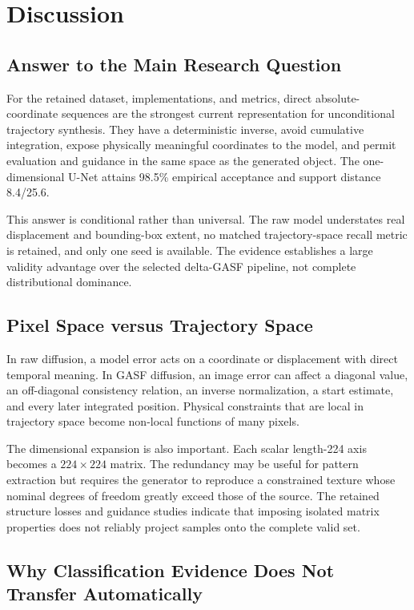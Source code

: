 \documentclass[12pt,a4paper,oneside]{report}
\begin{document}
\chapter{Discussion}
\label{chap:discussion}

\section{Answer to the Main Research Question}

For the retained dataset, implementations, and metrics, direct absolute-coordinate sequences are the strongest current representation for unconditional trajectory synthesis. They have a deterministic inverse, avoid cumulative integration, expose physically meaningful coordinates to the model, and permit evaluation and guidance in the same space as the generated object. The one-dimensional U-Net attains 98.5\% empirical acceptance and support distance 8.4/25.6.

This answer is conditional rather than universal. The raw model understates real displacement and bounding-box extent, no matched trajectory-space recall metric is retained, and only one seed is available. The evidence establishes a large validity advantage over the selected delta-GASF pipeline, not complete distributional dominance.

\section{Pixel Space versus Trajectory Space}

In raw diffusion, a model error acts on a coordinate or displacement with direct temporal meaning. In GASF diffusion, an image error can affect a diagonal value, an off-diagonal consistency relation, an inverse normalization, a start estimate, and every later integrated position. Physical constraints that are local in trajectory space become non-local functions of many pixels.

The dimensional expansion is also important. Each scalar length-224 axis becomes a $224\times224$ matrix. The redundancy may be useful for pattern extraction but requires the generator to reproduce a constrained texture whose nominal degrees of freedom greatly exceed those of the source. The retained structure losses and guidance studies indicate that imposing isolated matrix properties does not reliably project samples onto the complete valid set.

\section{Why Classification Evidence Does Not Transfer Automatically}
\end{document}
